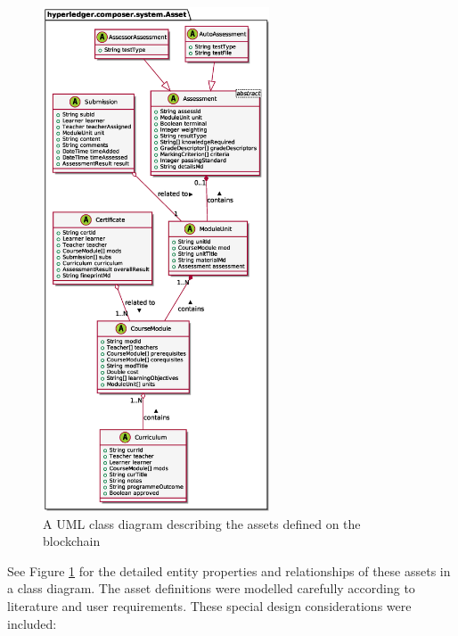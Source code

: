 \begin{figure}[!ht]
	\centering
	\includegraphics[width=0.6\textwidth]{assets}
	\caption[Assets Class Diagram]
	{A UML class diagram describing the assets defined on the blockchain}
	\label{fig:assets}
\end{figure}

See Figure \ref{fig:assets} for the detailed entity properties and relationships of these assets in a class diagram.
The asset definitions were modelled carefully according to literature and user requirements.
These special design considerations were included:

